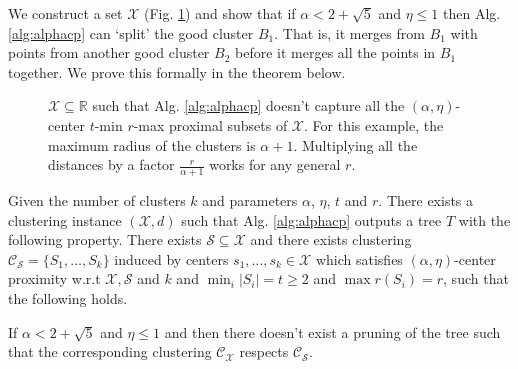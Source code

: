 \documentclass[anon,12pt]{colt2016} %
\newcommand{\mc}{\mathcal}
\begin{document}
We construct a set $\mc X$ (Fig. \ref{fig:algAlphacp}) and show that if $\alpha < 2 + \sqrt{5}$ and $\eta \le 1$ then Alg. \ref{alg:alphacp} can `split' the good cluster $B_1$. That is, it merges from $B_1$ with points from another good cluster $B_2$ before it merges all the points in $B_1$ together. We prove this formally in the theorem below.
 
\begin{figure}

\caption{$\mc X \subseteq \mathbb{R}$ such that Alg. \ref{alg:alphacp} doesn't capture all the $(\alpha, \eta)$-center $t$-min $r$-max proximal subsets of $\mc X$. For this example, the maximum radius of the clusters is $\alpha+1$. Multiplying all the distances by a factor $\frac{r}{\alpha+1}$ works for any general $r$.}
\label{fig:algAlphacp}
\end{figure}

\begin{theorem}
\label{thm:algAlphacp}
Given the number of clusters $k$ and parameters $\alpha$, $\eta$, $t$ and $r$. There exists a clustering instance $(\mc X, d)$ such that Alg. \ref{alg:alphacp} outputs a tree $T$ with the following property. There exists $\mc S \subseteq \mc X$ and there exists clustering $\mc C_{\mc S} = \{S_1, \ldots, S_k\}$ induced by centers $s_1, \ldots, s_k \in \mc X$ which satisfies $(\alpha, \eta)$-center proximity w.r.t $\mc X, \mc S$ and $k$ and $ \min_i|S_i| = t \ge 2$ and $\max r(S_i) = r$, such that the following holds. 

If $\alpha < 2 + \sqrt 5$ and $\eta \le 1$ and then there doesn't exist a pruning of the tree such that the corresponding clustering $\mc C_{\mc X}$ respects $\mc C_{\mc S}$.
\end{theorem}
\end{document}
